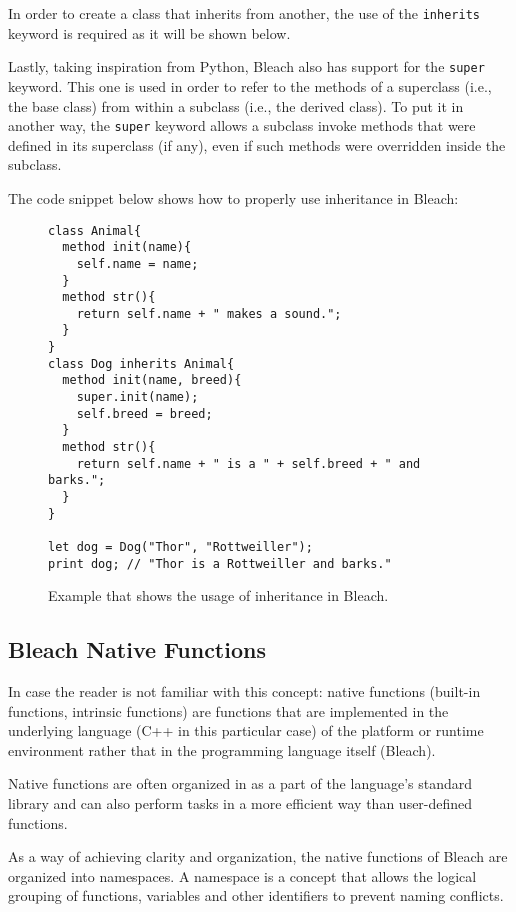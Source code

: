 \begin{itemize}
    In order to create a class that inherits from another, the use of the \texttt{inherits} keyword is required as it will be shown below.

    Lastly, taking inspiration from Python, Bleach also has support for the \texttt{super} keyword. This one is used in order to refer to the methods of a superclass (i.e., the base class) from within a subclass (i.e., the derived class). To put it in another way, the \texttt{super} keyword allows a subclass invoke methods that were defined in its superclass (if any), even if such methods were overridden inside the subclass. 

    The code snippet below shows how to properly use inheritance in Bleach:
\begin{figure}[H]
    \centering
    \begin{lstlisting}
class Animal{
  method init(name){
    self.name = name;
  }
  method str(){
    return self.name + " makes a sound.";
  }
}
class Dog inherits Animal{
  method init(name, breed){
    super.init(name);
    self.breed = breed;
  }
  method str(){
    return self.name + " is a " + self.breed + " and barks.";
  }
}

let dog = Dog("Thor", "Rottweiller");
print dog; // "Thor is a Rottweiller and barks."
    \end{lstlisting}
    \caption{Example that shows the usage of inheritance in Bleach.}
\end{figure}
    
\end{itemize}

\subsection{Bleach Native Functions}
In case the reader is not familiar with this concept: native functions (built-in functions, intrinsic functions) are functions that are implemented in the underlying language (C++ in this particular case) of the platform or runtime environment rather that in the programming language itself (Bleach).

Native functions are often organized in as a part of the language's standard library and can also perform tasks in a more efficient way than user-defined functions.

As a way of achieving clarity and organization, the native functions of Bleach are organized into namespaces. A namespace is a concept that allows the logical grouping of functions, variables and other identifiers to prevent naming conflicts.

